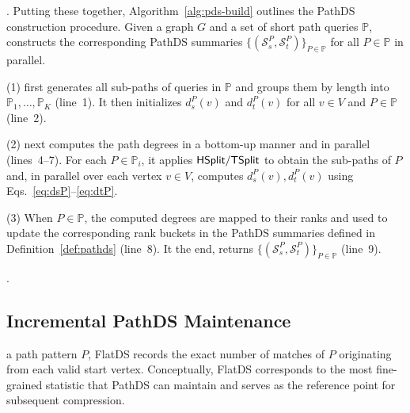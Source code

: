 . %
Putting these together, Algorithm~\ref{alg:pds-build} outlines the
PathDS construction procedure. %
Given a graph $G$ and a set of short path
queries $\mathbb{P}$,  constructs the corresponding PathDS
summaries $\{(\mathcal{S}_s^P, \mathcal{S}_t^P)\}_{P\in\mathbb{P}}$ for
all $P\in\mathbb{P}$ in parallel. 

\sstab (1)  first generates all sub-paths of queries in
$\mathbb{P}$ and groups them by length into
$\mathbb{P}_1,\dots,\mathbb{P}_K$ (line~1). %
It then initializes $d_s^P(v)$ and
$d_t^P(v)$ for all $v\in V$ and $P\in\mathbb{P}$ (line~2).

\sstab (2)  next computes the path degrees in a
bottom-up manner and in parallel (lines~4--7). For each
$P\in\mathbb{P}_i$, it applies ${\mathsf{HSplit}}/{\mathsf{TSplit}}$ to obtain the
sub-paths of $P$ and, in parallel over each vertex $v\in V$, computes
 $d_s^P(v),d_t^P(v)$ using  Eqs.~\eqref{eq:dsP}--\eqref{eq:dtP}. 

\sstab (3) When $P\in\mathbb{P}$, the computed degrees are mapped to
their ranks and used to update the corresponding rank buckets in the
PathDS summaries defined in Definition~\ref{def:pathds} (line~8).
It the end,  returns
$\{(\mathcal{S}_s^P,\mathcal{S}_t^P)\}_{P\in\mathbb{P}}$ (line~9).

. 

\subsection{Incremental PathDS Maintenance}\label{susbsec:pds-maintenance}

\newpage

\label{subsec:flatr} a path pattern $P$, FlatDS records the exact number of matches of
$P$ originating from each valid start vertex.
Conceptually, FlatDS corresponds to the most fine-grained statistic
that PathDS can maintain and serves as the reference point for
subsequent compression.

